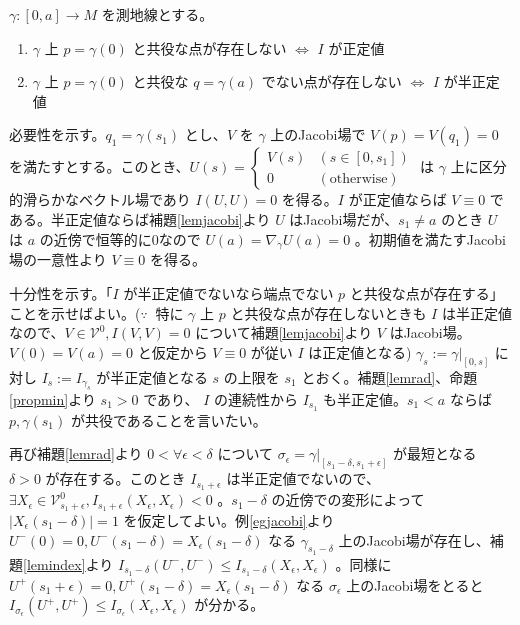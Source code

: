 \documentclass[dvipdfmx,a4paper]{jsreport}
\theoremstyle{definition}
\begin{document}
\prop\label{propconj} $\gamma:[0,a] \to M$ を測地線とする。
\begin{enumerate}
    \item $\gamma$ 上 $p=\gamma(0)$ と共役な点が存在しない $\iff$ $I$ が正定値
    \item $\gamma$ 上 $p=\gamma(0)$ と共役な $q=\gamma(a)$ でない点が存在しない $\iff$ $I$ が半正定値
\end{enumerate}

\prf 必要性を示す。$q_1=\gamma(s_1)$ とし、$V$ を $\gamma$ 上のJacobi場で $V(p)=V(q_1)=0$ を満たすとする。このとき、$U(s)=\begin{cases}
    V(s)&(s \in [0,s_1]) \\
    0 & (\mbox{otherwise})
\end{cases}$ は $\gamma$ 上に区分的滑らかなベクトル場であり $I(U,U)=0$ を得る。$I$ が正定値ならば $V \equiv 0$ である。半正定値ならば補題\ref{lemjacobi}より $U$ はJacobi場だが、$s_1 \neq a$ のとき $U$ は $a$ の近傍で恒等的に0なので $U(a)=\nabla_{\dot{\gamma}}U(a)=0$ 。初期値を満たすJacobi場の一意性より $V \equiv 0$ を得る。

十分性を示す。「$I$ が半正定値でないなら端点でない $p$ と共役な点が存在する」ことを示せばよい。($\because \ $ 特に $\gamma$ 上 $p$ と共役な点が存在しないときも $I$ は半正定値なので、$V \in \mathcal{V}^0,I(V,V)=0$ について補題\ref{lemjacobi}より $V$ はJacobi場。$V(0)=V(a)=0$ と仮定から $V \equiv 0$ が従い $I$ は正定値となる)
$\gamma_s:=\gamma|_{[0,s]}$ に対し $I_s:=I_{\gamma_s}$ が半正定値となる $s$ の上限を $s_1$ とおく。補題\ref{lemrad}、命題\ref{propmin}より $s_1>0$ であり、 $I$ の連続性から $I_{s_1}$ も半正定値。$s_1<a$ ならば $p,\gamma(s_1)$ が共役であることを言いたい。

再び補題\ref{lemrad}より $0<\forall \epsilon<\delta$ について $\sigma_{\epsilon}=\gamma|_{[s_1-\delta,s_1+\epsilon]}$ が最短となる $\delta>0$ が存在する。このとき $I_{s_1+\epsilon}$ は半正定値でないので、 $\exists X_\epsilon \in \mathcal{V}^0_{s_1+\epsilon},I_{s_1+\epsilon}(X_\epsilon,X_\epsilon)<0$ 。$s_1-\delta$ の近傍での変形によって $|X_\epsilon(s_1-\delta)|=1$ を仮定してよい。例\ref{egjacobi}より $U^-(0)=0,U^-(s_1-\delta)=X_\epsilon(s_1-\delta)$ なる $\gamma_{s_1-\delta}$ 上のJacobi場が存在し、補題\ref{lemindex}より $I_{s_1-\delta}(U^-,U^-) \leq I_{s_1-\delta}(X_\epsilon,X_\epsilon)$ 。同様に $U^+(s_1+\epsilon)=0,U^+(s_1-\delta)=X_\epsilon(s_1-\delta)$ なる $\sigma_{\epsilon}$ 上のJacobi場をとると $I_{\sigma_{\epsilon}}(U^+,U^+) \leq I_{\sigma_{\epsilon}}(X_\epsilon,X_\epsilon)$ が分かる。
\end{document}
